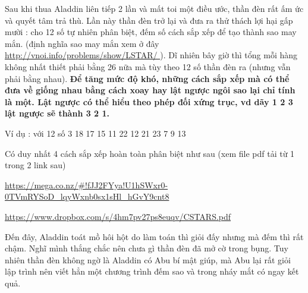 Sau khi thua Aladdin liên tiếp 2 lần và mất toi một điều ước, thần đèn rất ấm ức và quyết tâm trả thù. Lần này thần đèn trở lại và đưa ra thử thách lợi hại gấp mười : cho 12 số tự nhiên phân biệt, đếm số cách sắp xếp để tạo thành sao may mắn. (định nghĩa sao may mắn xem ở đây \href{http://vnoi.info/problems/show/LSTAR/}{ http://vnoi.info/problems/show/LSTAR/ } ). Dĩ nhiên bây giờ thì tổng mỗi hàng không nhất thiết phải bằng 26 nữa mà tùy theo 12 số thần đèn ra (nhưng vẫn phải bằng nhau). \textbf{ Để tăng mức độ khó, những cách sắp xếp mà có thể đưa về giống nhau bằng cách xoay hay lật ngược ngôi sao lại chỉ tính là một. Lật ngược có thể hiểu theo phép đối xứng trục, vd dãy 1 2 3 lật ngược sẽ thành 3 2 1. }

Ví dụ : với 12 số 3 18 17 15 11 22 12 21 23 7 9 13

Có duy nhất 4 cách sắp xếp hoàn toàn phân biệt như sau (xem file pdf tải từ 1 trong 2 link sau)

\href{https://mega.co.nz/#!fJJ2FYya!U1hSWxr0-0TVmRYSoD_lqyWxnb0sx1sHl_hGvY9cnt8}{https://mega.co.nz/\#!fJJ2FYya!U1hSWxr0-0TVmRYSoD\_lqyWxnb0sx1sHl\_hGvY9cnt8 }

\href{https://www.dropbox.com/s/4hm7pv27ps8euqv/CSTARS.pdf}{https://www.dropbox.com/s/4hm7pv27ps8euqv/CSTARS.pdf }

Đến đây, Aladdin toát mồ hôi hột do làm toán thì giỏi đấy nhưng mà đếm thì rất chậm. Nghĩ mình thắng chắc nên chưa gì thần đèn đã mở cờ trong bụng. Tuy nhiên thần đèn không ngờ là Aladdin có Abu bí mật giúp, mà Abu lại rất giỏi lập trình nên viết hẳn một chương trình đếm sao và trong nháy mắt có ngay kết quả.
